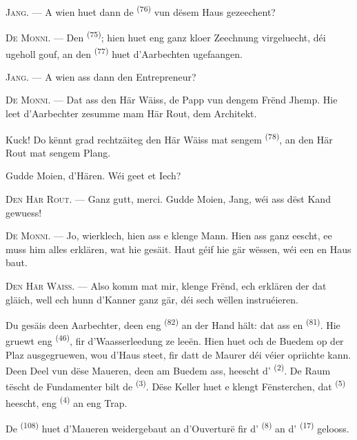 \textsc{Jang}. --- A wien huet dann de  \textsuperscript{(76)} vun dësem
Haus gezeechent?

\textsc{De Monni}. --- Den  \textsuperscript{(75)}; hien huet eng
ganz kloer Zeechnung virgeluecht, déi ugeholl gouf, an den
 \textsuperscript{(77)} huet d'Aarbechten ugefaangen.

\textsc{Jang}. --- A wien ass dann den Entrepreneur?

\textsc{De Monni}. --- Dat ass den Här Wäiss, de Papp vun dengem Frënd Jhemp. Hie
leet d'Aarbechter zesumme mam Här Rout, dem Architekt.

Kuck! Do kënnt grad rechtzäiteg den Här Wäiss mat sengem 
\textsuperscript{(78)}, an den Här Rout mat sengem Plang.

Gudde Moien, d'Hären. Wéi geet et Iech?

\textsc{Den Här Rout}. --- Ganz gutt, merci. Gudde Moien, Jang, wéi ass dëst Kand
gewuess!

\textsc{De Monni}. --- Jo, wierklech, hien ass e klenge Mann. Hien ass ganz eescht,
ee muss him alles erklären, wat hie gesäit. Haut géif hie gär wëssen, wéi een en Haus
baut.

\VUsaut{3.0mm}

\textsc{Den Här Wäiss}. --- Also komm mat mir, klenge Frënd, ech erklären der dat
gläich, well ech hunn d'Kanner ganz gär, déi sech wëllen instruéieren.

Du gesäis deen Aarbechter, deen eng  \textsuperscript{(82)} an der
Hand hält: dat ass en  \textsuperscript{(81)}. Hie gruewt eng
 \textsuperscript{(46)}, fir d'Waasserleedung ze leeën. Hien huet och de
Buedem op der Plaz ausgegruewen, wou d'Haus steet, fir datt de Maurer déi véier
 opriichte kann. Deen Deel vun dëse Maueren, deen am Buedem ass,
heescht d' \textsuperscript{(2)}. De Raum tëscht de Fundamenter
bilt de  \textsuperscript{(3)}. Dëse Keller huet e klengt Fënsterchen,
dat  \textsuperscript{(5)} heescht, eng 
\textsuperscript{(4)} an eng Trap.

De  \textsuperscript{(108)} huet d'Maueren weidergebaut an
d'Ouverturë fir d' \textsuperscript{(8)} an d'
\textsuperscript{(17)} gelooss.

